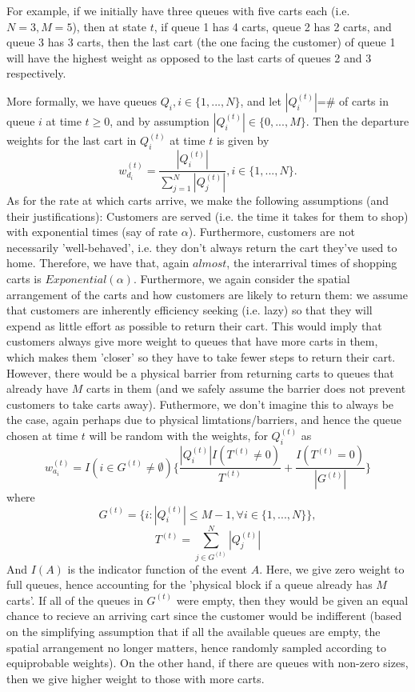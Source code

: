 \documentclass[english]{article}
\begin{document}
For example, if we initially have three queues with five carts each (i.e. $N=3,M=5$), then at state $t$, if queue 1 has 4 carts, queue 2 has 2 carts, and queue 3 has 3 carts, then the last cart (the one facing the customer) of queue 1 will have the highest weight as opposed to the last carts of queues 2 and 3 respectively.

More formally, we have queues $Q_i, i\in\{1,...,N\}$, and let $|Q_{i}^{(t)}|$=\# of carts in queue $i$ at time $t\geq0$, and by assumption $|Q_{i}^{(t)}|\in\{0,...,M\}$. Then the departure weights for the last cart in $Q_{i}^{(t)}$ at time $t$ is given by 
\[
w_{d_i}^{(t)}=\frac{|Q_{i}^{(t)}|}{\sum_{j=1}^{N}|Q_{j}^{(t)}|}, i \in \{ 1,..., N\}.
\]
As for the rate at which carts arrive, we make the following assumptions (and their justifications): Customers are served (i.e. the time it takes for them to shop) with exponential times (say of rate $\alpha$). Furthermore, customers are not necessarily 'well-behaved', i.e. they don't always return the cart they've used to home. Therefore, we have that, again $almost$, the interarrival times of shopping carts is $Exponential(\alpha)$. Furthermore, we again consider the spatial arrangement of the carts and how customers are likely to return them: we assume that customers are inherently efficiency seeking (i.e. lazy) so that they will expend as little effort as possible to return their cart. This would imply that customers always give more weight to queues that have more carts in them, which makes them 'closer' so they have to take fewer steps to return their cart. However, there would be a physical barrier from returning carts to queues that already have $M$ carts in them (and we safely assume the barrier does not prevent customers to take carts away). Futhermore, we don't imagine this to always be the case, again perhaps due to physical limtations/barriers, and hence the queue chosen at time $t$ will be random with the weights, for $Q_{i}^{(t)}$ as
\[
w_{a_i}^{(t)}=I(i \in G^{(t)} \neq \emptyset) \{\frac{|Q_{i}^{(t)}|I( T^{(t)} \neq 0 )}{ T^{(t)}} + \frac{I( T^{(t)} = 0)}{|G^{(t)}|}\}
\]
where
\[
G^{(t)}=\{i:|Q_{i}^{(t)}| \leq M-1, \forall  i \in \{ 1,..., N\} \},  
\]
\[
T^{(t)} = \sum_{j\in G^{(t)}}^{N}|Q_{j}^{(t)}|
\]
And $I(A)$ is the indicator function of the event $A$. Here, we give zero weight to full queues, hence accounting for the 'physical block if a queue already has $M$ carts'. If all of the queues in $G^{(t)}$ were empty, then they would be given an equal chance to recieve an arriving cart since the customer would be indifferent (based on the simplifying assumption that if all the available queues are empty, the spatial arrangement no longer matters, hence randomly sampled according to equiprobable weights). On the other hand, if there are queues with non-zero sizes, then we give higher weight to those with more carts.
\end{document}
